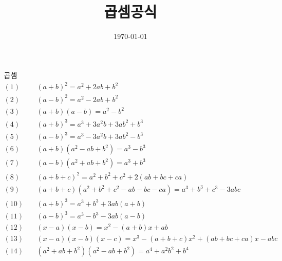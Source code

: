 \documentclass{article}
\title{곱셈공식}
\date{\today}
\author{}
\begin{document}

\begin{align*}
\text{곱셈공식}\\
(1) &\quad(a+b)^2 = a^2+2ab+b^2\\
(2) &\quad(a-b)^2 = a^2-2ab+b^2\\
(3) &\quad(a+b)(a-b) = a^2-b^2\\[10pt]
(4) &\quad(a+b)^3 = a^3+3a^2b+3ab^2+b^3\\
(5) &\quad(a-b)^3 = a^3-3a^2b+3ab^2-b^3\\[10pt]
(6) &\quad(a+b)(a^2-ab+b^2) = a^3-b^3\\
(7) &\quad(a-b)(a^2+ab+b^2) = a^3+b^3\\[10pt]
(8) &\quad(a+b+c)^2 = a^2+b^2+c^2+2(ab+bc+ca)\\
(9) &\quad(a+b+c)(a^2+b^2+c^2-ab-bc-ca) = a^3+b^3+c^3-3abc\\[10pt]
(10) &\quad(a+b)^3 = a^3+b^3+3ab(a+b)\\
(11) &\quad(a-b)^3 = a^3-b^3-3ab(a-b)\\[10pt]
(12) &\quad(x-a)(x-b)=x^2-(a+b)x+ab\\
(13) &\quad(x-a)(x-b)(x-c)=x^3-(a+b+c)x^2+(ab+bc+ca)x-abc\\[10pt]
(14) &\quad(a^2+ab+b^2)(a^2-ab+b^2)=a^4+a^2b^2+b^4\\
\end{align*}
\end{document}
